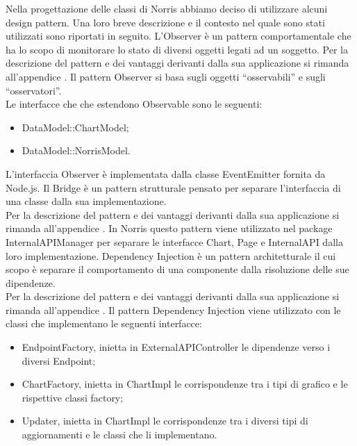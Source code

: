 			Nella progettazione delle classi di Norris abbiamo deciso di utilizzare alcuni design pattern. Una loro breve descrizione e il contesto nel quale sono stati utilizzati sono riportati in seguito.
				L'Observer è un pattern comportamentale che ha lo scopo di monitorare lo stato di diversi oggetti legati ad un soggetto.
				Per la descrizione del pattern e dei vantaggi derivanti dalla sua applicazione si rimanda all'appendice .
					Il pattern Observer si basa sugli oggetti “osservabili” e sugli “osservatori”.\\
					Le interfacce che che estendono Observable sono le seguenti:
					\begin{itemize}
						\item DataModel::ChartModel;
						\item DataModel::NorrisModel.
					\end{itemize}
					L'interfaccia Observer è implementata dalla classe EventEmitter fornita da Node.js.
				Il Bridge è un pattern strutturale pensato per separare l'interfaccia di una classe dalla sua implementazione.\\
				Per la descrizione del pattern e dei vantaggi derivanti dalla sua applicazione si rimanda all'appendice .
					In Norris questo pattern viene utilizzato nel package InternalAPIManager per separare le interfacce Chart, Page e InternalAPI dalla loro implementazione.
				Dependency Injection è un pattern architetturale il cui scopo è separare il comportamento di una componente dalla risoluzione delle sue dipendenze.\\
				Per la descrizione del pattern e dei vantaggi derivanti dalla sua applicazione si rimanda all'appendice .
					Il pattern Dependency Injection viene utilizzato con le classi che implementano le seguenti interfacce:
					\begin{itemize}
						\item EndpointFactory, inietta in ExternalAPIController le dipendenze verso i diversi Endpoint;
						\item ChartFactory, inietta in ChartImpl le  corrispondenze tra i tipi di grafico e le rispettive classi factory;
						\item Updater, inietta in ChartImpl le corrispondenze tra i diversi tipi di aggiornamenti e le classi che li implementano.
					\end{itemize}
